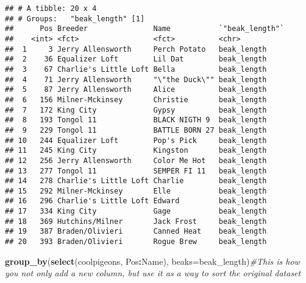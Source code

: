 \documentclass[]{article}
\newenvironment{Shaded}{\begin{snugshade}}{\end{snugshade}}
\newcommand{\KeywordTok}[1]{\textcolor[rgb]{0.13,0.29,0.53}{\textbf{#1}}}
\newcommand{\DataTypeTok}[1]{\textcolor[rgb]{0.13,0.29,0.53}{#1}}
\newcommand{\CommentTok}[1]{\textcolor[rgb]{0.56,0.35,0.01}{\textit{#1}}}
\newcommand{\OperatorTok}[1]{\textcolor[rgb]{0.81,0.36,0.00}{\textbf{#1}}}
\newcommand{\NormalTok}[1]{#1}
\begin{document}
\begin{verbatim}
## # A tibble: 20 x 4
## # Groups:   "beak_length" [1]
##      Pos Breeder               Name           `"beak_length"`
##    <int> <fct>                 <fct>          <chr>          
##  1     3 Jerry Allensworth     Perch Potato   beak_length    
##  2    36 Equalizer Loft        Lil Dat        beak_length    
##  3    67 Charlie's Little Loft Bella          beak_length    
##  4    71 Jerry Allensworth     "\"the Duck\"" beak_length    
##  5    87 Jerry Allensworth     Alice          beak_length    
##  6   156 Milner-Mckinsey       Christie       beak_length    
##  7   172 King City             Gypsy          beak_length    
##  8   193 Tongol 11             BLACK NIGTH 9  beak_length    
##  9   229 Tongol 11             BATTLE BORN 27 beak_length    
## 10   244 Equalizer Loft        Pop's Pick     beak_length    
## 11   245 King City             Kingston       beak_length    
## 12   256 Jerry Allensworth     Color Me Hot   beak_length    
## 13   277 Tongol 11             SEMPER FI 11   beak_length    
## 14   278 Charlie's Little Loft Charlie        beak_length    
## 15   292 Milner-Mckinsey       Elle           beak_length    
## 16   296 Charlie's Little Loft Edward         beak_length    
## 17   334 King City             Gage           beak_length    
## 18   369 Hutchins/Milner       Jack Frost     beak_length    
## 19   387 Braden/Olivieri       Canned Heat    beak_length    
## 20   393 Braden/Olivieri       Rogue Brew     beak_length
\end{verbatim}

\begin{Shaded}
\begin{Highlighting}[]
\KeywordTok{group_by}\NormalTok{(}\KeywordTok{select}\NormalTok{(coolpigeons, Pos}\OperatorTok{:}\NormalTok{Name), }\DataTypeTok{beaks=}\NormalTok{beak_length)}\CommentTok{#This is how you not only add a new column, but use it as a way to sort the original dataset}
\end{Highlighting}
\end{Shaded}
\end{document}
